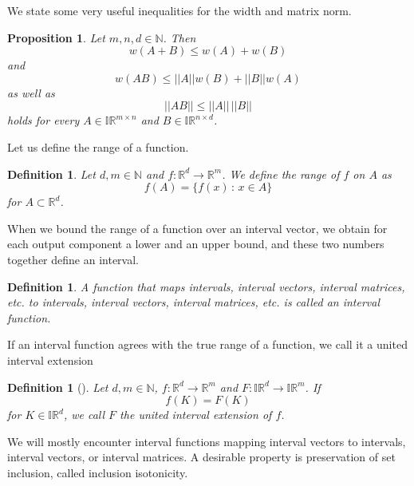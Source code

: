 \documentclass[a4paper, 11pt]{article}
\newtheorem{proposition}[theorem]{Proposition}
\newtheorem{definition}[theorem]{Definition}
\begin{document}
	
	We state some very useful inequalities for the width and matrix norm.
	
	\begin{proposition}
		Let $m,n,d\in \mathbb{N}$. Then
		\begin{equation}\label{eq: width subadditivity}
			w(A+B) \leq w(A) + w(B)
		\end{equation}
		and
		\begin{equation}\label{eq: matrix width inequality}
			w(AB) \leq ||A||w(B) + ||B||w(A)
		\end{equation}
		as well as
		\begin{equation}\label{eq: matrix magnitude inequality}
			||AB|| \leq ||A|| \, ||B||
		\end{equation}
		holds for every $A \in \mathbb{IR}^{m\times n}$ and $B \in \mathbb{IR}^{n \times d}$.
	\end{proposition}
	

    Let us define the range of a function.

    \begin{definition}
        Let $d,m\in \mathbb{N}$ and $f: \mathbb{R}^d  \to \mathbb{R}^m$. We define the range of $f$ on $A$
        as
        $$ f(A) = \{f(x) \, : \, x \in A\} $$
        for $A \subset \mathbb{R}^d$.
    \end{definition}
	
	When we bound the range of a function over an interval vector, we obtain for each output component a lower and an upper bound, and these two numbers together define an interval.
    
	\begin{definition}
		A function that maps intervals, interval vectors, interval matrices, etc. to intervals, interval vectors, interval matrices, etc. is called an interval function.
	\end{definition}

    If an interval function agrees with the true range of a function, we call it a united interval extension

    \begin{definition}[\cite{moore2009introduction}]
        Let $d,m\in \mathbb{N}$, $f:\mathbb{R}^d \to \mathbb{R}^m$ and $F: \mathbb{IR}^d  \to \mathbb{IR}^m$. If
        $$ f(K) = F(K) $$
        for $K \in \mathbb{IR}^d$, we call $F$ the united interval extension of $f$.
    \end{definition}
	
	We will mostly encounter interval functions mapping interval vectors to intervals, interval vectors, or interval matrices. A desirable property is preservation of set inclusion, called inclusion isotonicity.
	
\end{document}
